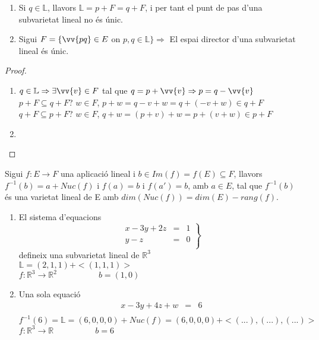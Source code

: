 \begin{prop}\begin{enumerate}
	\item Si $q\in \mathbb{L}$, llavors $\mathbb{L}=p+F=q+F$, i per tant el punt de pas d'una subvarietat lineal no és únic.
	\item Sigui $F=\{ \vv{pq}\in E$ on $p,q\in \mathbb{L}\}\Rightarrow$ El espai director d'una subvarietat lineal és únic.
\end{enumerate}\end{prop}
\begin{proof}\begin{enumerate}
	\item $q\in \mathbb{L}\Rightarrow\exists\vv{v}\in F$ tal que $q=p+\vv{v}\Rightarrow p=q-\vv{v}$ \\
	$p+F\subseteq q+F$? $w\in F$, $p+w=q-v+w=q+(-v+w)\in q+F$ \\
	$q+F\subseteq p+F$? $w\in F$, $q+w=(p+v)+w=p+(v+w)\in p+F$
	\item
\end{enumerate}\end{proof}

\begin{prop}
	Sigui $f:E\longrightarrow F$ una aplicació lineal i $b\in Im(f)=f(E)\subseteq F$, llavors $f^{-1}(b)=a+Nuc(f)$ i $f(a)=b$ i $f(a')=b$, amb $a\in E$, tal que $f^{-1}(b)$ és una varietat lineal de E amb $dim(Nuc(f))=dim(E)-rang(f)$.
\end{prop}
\begin{exmp}\begin{enumerate}
	\item El sistema d'equacions \\
	$$\left.\begin{array}{rcl}
		x-3y+2z	& =	& 	1	\\
		y-z	& =	&	0	\\
	\end{array}\right\}$$
	defineix una subvarietat lineal de $\mathbb{R}^{3}$ \\
	$\mathbb{L}=(2,1,1)+<(1,1,1)>$ \\
	$f:\mathbb{R}^{3}\longrightarrow \mathbb{R}^{2}\hspace{5em}b=(1,0)$
	\item Una sola equació
	$$\begin{array}{rcl}
		x-3y+4z+w	& =	& 6	\\
	\end{array}$$
	$f^{-1}(6)=\mathbb{L}=(6,0,0,0)+Nuc(f)=(6,0,0,0)+<(...),(...),(...)>$ \\
	$f:\mathbb{R}^{3}\longrightarrow \mathbb{R}\hspace{5em}b=6$
\end{enumerate}\end{exmp}

